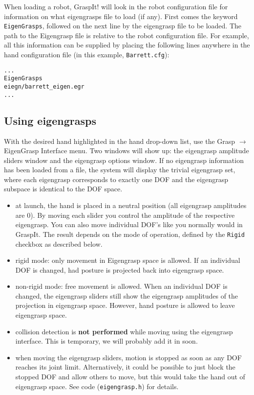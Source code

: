 When loading a robot, GraspIt! will look in the robot configuration
file for information on what eigengrasps file to load (if any). First
comes the keyword \texttt{EigenGrasps}, followed on the next line by
the eigengrasp file to be loaded. The path to the Eigengrasp file is
relative to the robot configuration file. For example, all this
information can be supplied by placing the following lines anywhere in
the hand configuration file (in this example, \texttt{Barrett.cfg}):

\begin{verbatim}
...
EigenGrasps
eiegn/barrett_eigen.egr
...
\end{verbatim}

\subsection{Using eigengrasps}

With the desired hand highlighted in the hand drop-down list, use the
Grasp $\rightarrow$ EigenGrasp Interface menu. Two windows will show up: the
eigengrasp amplitude sliders window and the eigengrasp options window.
If no eigengrasp information has been loaded from a file, the system
will display the trivial eigengrasp set, where each eigengrasp
corresponds to exactly one DOF and the eigengrasp subspace is
identical to the DOF space.
\begin{itemize}
\item at launch, the hand is placed in a neutral position (all
  eigengrasp amplitudes are 0). By moving each slider you control the
  amplitude of the respective eigengrasp. You can also move individual
  DOF's like you normally would in GraspIt. The result depends on the
  mode of operation, defined by the \texttt{Rigid} checkbox as
  described below.
\item rigid mode: only movement in Eigengrasp space is allowed. If an
  individual DOF is changed, had posture is projected back into
  eigengrasp space.
\item non-rigid mode: free movement is allowed. When an individual DOF
  is changed, the eigengrasp sliders still show the eigengrasp
  amplitudes of the projection in eigengrasp space. However, hand
  posture is allowed to leave eigengrasp space.
\item collision detection is \textbf{not performed} while moving using
  the eigengrasp interface. This is temporary, we will probably add it
  in soon.
\item when moving the eigengrasp sliders, motion is stopped as soon as
  any DOF reaches its joint limit. Alternatively, it could be possible
  to just block the stopped DOF and allow others to move, but this
  would take the hand out of eigengrasp space. See code
  (\texttt{eigengrasp.h}) for details.
\end{itemize}
